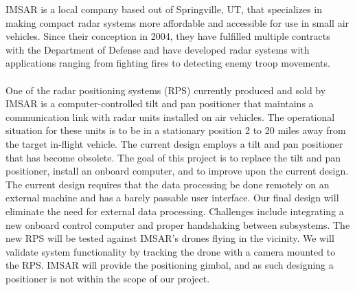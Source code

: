 
IMSAR is a local company based out of Springville, UT, that specializes in making compact radar systems more affordable and accessible for use in small air vehicles. Since their conception in 2004, they have fulfilled multiple contracts with the Department of Defense and have developed radar systems with applications ranging from fighting fires to detecting enemy troop movements.
~\\~\\
One of the radar positioning systems (RPS) currently produced and sold by IMSAR is a computer-controlled tilt and pan positioner that maintains a communication link with radar units installed on air vehicles. The operational situation for these units is to be in a stationary position 2 to 20 miles away from the target in-flight vehicle. The current design employs a tilt and pan positioner that has become obsolete. The goal of this project is to replace the tilt and pan positioner, install an onboard computer, and to improve upon the current design. The current design requires that the data processing be done remotely on an external machine and has a barely passable user interface. Our final design will eliminate the need for external data processing. Challenges include integrating a new onboard control computer and proper handshaking between subsystems. The new RPS will be tested against IMSAR's drones flying in the vicinity. We will validate system functionality by tracking the drone with a camera mounted to the RPS. IMSAR will provide the positioning gimbal, and as such designing a positioner is not within the scope of our project.\\

